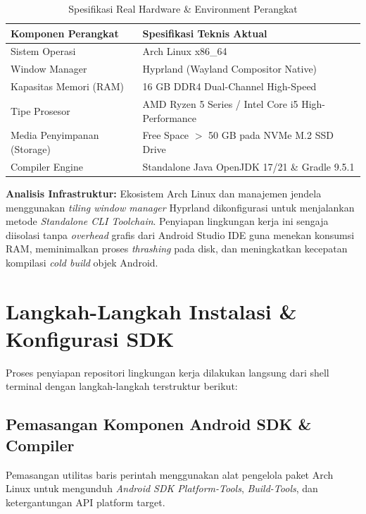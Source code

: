 \documentclass[12pt,a4paper]{article}
\begin{document}
\begin{table}[h!]
    \centering
    \caption{Spesifikasi Real Hardware \& Environment Perangkat}
    \vspace{0.2cm}
    \begin{tabular}{ll}
        \toprule
        \textbf{Komponen Perangkat} & \textbf{Spesifikasi Teknis Aktual} \\
        \midrule
        Sistem Operasi & Arch Linux x86\_64 \\
        Window Manager & Hyprland (Wayland Compositor Native) \\
        Kapasitas Memori (RAM) & 16 GB DDR4 Dual-Channel High-Speed \\
        Tipe Prosesor & AMD Ryzen 5 Series / Intel Core i5 High-Performance \\
        Media Penyimpanan (Storage) & Free Space $>$ 50 GB pada NVMe M.2 SSD Drive \\
        Compiler Engine & Standalone Java OpenJDK 17/21 \& Gradle 9.5.1 \\
        \bottomrule
    \end{tabular}
\end{table}

\textbf{Analisis Infrastruktur:} Ekosistem Arch Linux dan manajemen jendela menggunakan \textit{tiling window manager} Hyprland dikonfigurasi untuk menjalankan metode \textit{Standalone CLI Toolchain}. Penyiapan lingkungan kerja ini sengaja diisolasi tanpa \textit{overhead} grafis dari Android Studio IDE guna menekan konsumsi RAM, meminimalkan proses \textit{thrashing} pada disk, dan meningkatkan kecepatan kompilasi \textit{cold build} objek Android.

\section{Langkah-Langkah Instalasi \& Konfigurasi SDK}
Proses penyiapan repositori lingkungan kerja dilakukan langsung dari shell terminal dengan langkah-langkah terstruktur berikut:

\subsection{Pemasangan Komponen Android SDK \& Compiler}
Pemasangan utilitas baris perintah menggunakan alat pengelola paket Arch Linux untuk mengunduh \textit{Android SDK Platform-Tools}, \textit{Build-Tools}, dan ketergantungan API platform target.
\end{document}
